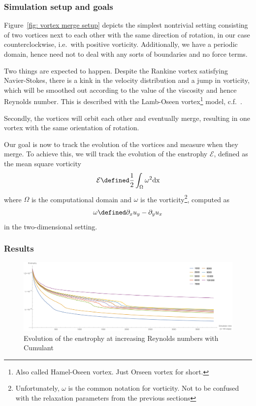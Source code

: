 \subsubsection{Simulation setup and goals}
\label{subs:Simulation setup and goals}

Figure~\ref{fig: vortex merge setup} depicts the simplest nontrivial setting consisting of two vortices next to each other with the same direction of rotation, in our case counterclockwise, i.e.\ with positive vorticity.
Additionally, we have a periodic domain, hence need not to deal with any sorts of boundaries and no force terms.

Two things are expected to happen.
Despite the Rankine vortex satisfying Navier-Stokes, there is a kink in the velocity distribution and a jump in vorticity, which will be smoothed out according to the value of the viscosity and hence Reynolds number.
This is described with the Lamb-Oseen vortex\footnote{Also called Hamel-Oseen vortex. Just Orseen vortex for short.} model, c.f.~\cite{tryggeson2007analytical}.

Secondly, the vortices will orbit each other and eventually merge, resulting in one vortex with the same orientation of rotation.

Our goal is now to track the evolution of the vortices and measure when they merge.
To achieve this, we will track the evolution of the enstrophy $\mathcal{E}$, defined as the mean square vorticity
\begin{equation}
  \label{eq: enstrophy}
  \mathcal{E} \defined \frac{1}{2}\int_{\Omega} \omega^2 \text{dx}
\end{equation}
where $\Omega$ is the computational domain and $\omega$ is the vorticity\footnote{Unfortunately, $\omega$ is the common notation for vorticity. Not to be confused with the relaxation parameters from the previous sections}, computed as
\begin{equation}
  \label{eq: vorticity}
  \omega \defined \partial_x u_y - \partial_y u_x
\end{equation}
in the two-dimensional setting.

\subsubsection{Results}
\label{subs:Results}

\begin{figure}
  \centering
  \includegraphics[width=\textwidth]{../figures/vortexMerge_enstrophy_cumulants.pdf}  %
  \caption{Evolution of the enstrophy at increasing Reynolds numbers with Cumulant}
\label{fig: rankine cumulant all}
\end{figure}

